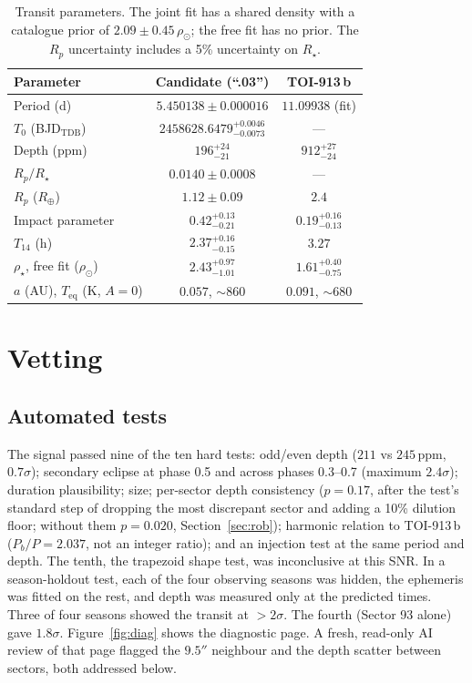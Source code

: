\documentclass[11pt]{article}
\begin{document}
\begin{table}[h]
\centering
\small
\begin{tabular}{lcc}
\toprule
Parameter & Candidate (``.03'') & TOI-913\,b \\
\midrule
Period (d) & $5.450138 \pm 0.000016$ & $11.09938$ (fit) \\
$T_0$ (BJD$_\mathrm{TDB}$) & $2458628.6479^{+0.0046}_{-0.0073}$ & --- \\
Depth (ppm) & $196^{+24}_{-21}$ & $912^{+27}_{-24}$ \\
$R_p/R_\star$ & $0.0140 \pm 0.0008$ & --- \\
$R_p$ ($R_\oplus$) & $1.12 \pm 0.09$ & $2.4$ \\
Impact parameter & $0.42^{+0.13}_{-0.21}$ & $0.19^{+0.16}_{-0.13}$ \\
$T_{14}$ (h) & $2.37^{+0.16}_{-0.15}$ & $3.27$ \\
$\rho_\star$, free fit ($\rho_\odot$) & $2.43^{+0.97}_{-1.01}$ & $1.61^{+0.40}_{-0.75}$ \\
$a$ (AU), $T_\mathrm{eq}$ (K, $A=0$) & $0.057$, $\sim860$ & $0.091$, $\sim680$ \\
\bottomrule
\end{tabular}
\caption{Transit parameters. The joint fit has a shared density with a catalogue prior of $2.09\pm0.45\,\rho_\odot$; the free fit has no prior. The $R_p$ uncertainty includes a 5\% uncertainty on $R_\star$.}
\label{tab:params}
\end{table}

\section{Vetting}
\subsection{Automated tests}
The signal passed nine of the ten hard tests: odd/even depth ($211$ vs $245$\,ppm, $0.7\sigma$); secondary eclipse at phase 0.5 and across phases 0.3--0.7 (maximum $2.4\sigma$); duration plausibility; size; per-sector depth consistency ($p=0.17$, after the test's standard step of dropping the most discrepant sector and adding a 10\% dilution floor; without them $p=0.020$, Section~\ref{sec:rob}); harmonic relation to TOI-913\,b ($P_b/P = 2.037$, not an integer ratio); and an injection test at the same period and depth. The tenth, the trapezoid shape test, was inconclusive at this SNR. In a season-holdout test, each of the four observing seasons was hidden, the ephemeris was fitted on the rest, and depth was measured only at the predicted times. Three of four seasons showed the transit at $>2\sigma$. The fourth (Sector 93 alone) gave $1.8\sigma$. Figure~\ref{fig:diag} shows the diagnostic page. A fresh, read-only AI review of that page flagged the $9.5''$ neighbour and the depth scatter between sectors, both addressed below.
\end{document}
